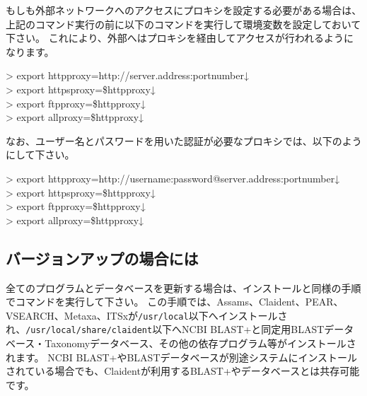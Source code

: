 \documentclass[titlepage,10pt,a4paper]{jsbook}
\newenvironment{cmd}{\begin{oframed}\raggedright\ttfamily\footnotesize\setlength{\baselineskip}{1.4em}}{\end{oframed}\vspace{-1em}}
\begin{document}
もしも外部ネットワークへのアクセスにプロキシを設定する必要がある場合は、上記のコマンド実行の前に以下のコマンドを実行して環境変数を設定しておいて下さい。
これにより、外部へはプロキシを経由してアクセスが行われるようになります。
\begin{cmd}
{\textgreater} export http{\textunderscore}proxy=http://server.address:portnumber↓\\
{\textgreater} export https{\textunderscore}proxy=\$http{\textunderscore}proxy↓\\
{\textgreater} export ftp{\textunderscore}proxy=\$http{\textunderscore}proxy↓\\
{\textgreater} export all{\textunderscore}proxy=\$http{\textunderscore}proxy↓
\end{cmd}
なお、ユーザー名とパスワードを用いた認証が必要なプロキシでは、以下のようにして下さい。
\begin{cmd}
{\textgreater} export http{\textunderscore}proxy=http://username:password@server.address:portnumber↓\\
{\textgreater} export https{\textunderscore}proxy=\$http{\textunderscore}proxy↓\\
{\textgreater} export ftp{\textunderscore}proxy=\$http{\textunderscore}proxy↓\\
{\textgreater} export all{\textunderscore}proxy=\$http{\textunderscore}proxy↓
\end{cmd}

\subsection{バージョンアップの場合には}

全てのプログラムとデータベースを更新する場合は、インストールと同様の手順でコマンドを実行して下さい。
この手順では、Assams、Claident、PEAR、VSEARCH、Metaxa、ITSxが\texttt{/usr/local}以下へインストールされ、\texttt{/usr/local/share/claident}以下へNCBI BLAST+と同定用BLASTデータベース・Taxonomyデータベース、その他の依存プログラム等がインストールされます。
NCBI BLAST+やBLASTデータベースが別途システムにインストールされている場合でも、Claidentが利用するBLAST+やデータベースとは共存可能です。
\end{document}
